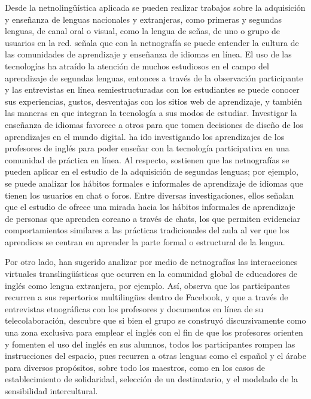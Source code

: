 Desde la netnolingüística aplicada se pueden realizar trabajos sobre la
adquisición y enseñanza de lenguas nacionales y extranjeras, como
primeras y segundas lenguas, de canal oral o visual, como la lengua de
señas, de uno o grupo de usuarios en la red. \textcite{kulavuz-onal2015} señala
que con la netnografía se puede entender la cultura de las comunidades
de aprendizaje y enseñanza de idiomas en línea. El uso de las
tecnologías ha atraído la atención de muchos estudiosos en el campo del
aprendizaje de segundas lenguas, entonces a través de la observación
participante y las entrevistas en línea semiestructuradas con los
estudiantes se puede conocer sus experiencias, gustos, desventajas con
los sitios web de aprendizaje, y también las maneras en que integran la
tecnología a sus modos de estudiar. Investigar la enseñanza de idiomas
favorece a otros para que tomen decisiones de diseño de los aprendizajes
en el mundo digital. \textcite{kulavuz-onal2013} ha ido investigando los
aprendizajes de los profesores de inglés para poder enseñar con la
tecnología participativa en una comunidad de práctica en línea. Al
respecto, \textcite{kesller2021} sostienen que las netnografías se
pueden aplicar en el estudio de la adquisición de segundas lenguas; por
ejemplo, se puede analizar los hábitos formales e informales de
aprendizaje de idiomas que tienen los usuarios en chat o foros. Entre
diversas investigaciones, ellos señalan que el estudio de \textcite{isbell2018online}
ofrece una mirada hacia los hábitos informales de aprendizaje de
personas que aprenden coreano a través de chats, los que permiten
evidenciar comportamientos similares a las prácticas tradicionales del
aula al ver que los aprendices se centran en aprender la parte formal o
estructural de la lengua.

Por otro lado, \textcite{kulavuzonal2018} han sugerido analizar por
medio de netnografías las interacciones virtuales translingüísticas que
ocurren en la comunidad global de educadores de inglés como lengua
extranjera, por ejemplo. Así, observa que los participantes recurren a
sus repertorios multilingües dentro de Facebook, y que a través de
entrevistas etnográficas con los profesores y documentos en línea de su
telecolaboración, descubre que si bien el grupo se construyó
discursivamente como una zona exclusiva para emplear el inglés con el
fin de que los profesores orienten y fomenten el uso del inglés en sus
alumnos, todos los participantes rompen las instrucciones del espacio,
pues recurren a otras lenguas como el español y el árabe para diversos
propósitos, sobre todo los maestros, como en los casos de
establecimiento de solidaridad, selección de un destinatario, y el
modelado de la sensibilidad intercultural.

